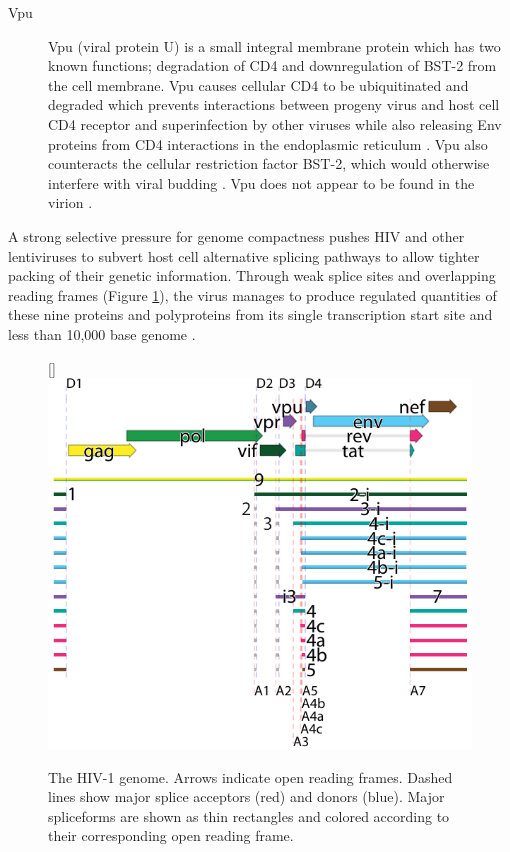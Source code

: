 \documentclass[../sherrill-Mix_thesis.tex]{subfiles}
\begin{document}
\begin{description}
		\item[Vpu]
			Vpu (viral protein U) \citep{Cohen1988,Strebel1988} is a small integral membrane protein which has two known functions; degradation of CD4 and downregulation of BST-2 from the cell membrane. Vpu causes cellular CD4 to be ubiquitinated and degraded \citep{Willey1992,Bour1995} which prevents interactions between progeny virus and host cell CD4 receptor \citep{Marshall1992,Lama1999,Ross1999,Cortes2002} and superinfection by other viruses \citep{Benson1993}  while also releasing Env proteins from CD4 interactions in the endoplasmic reticulum \citep{Crise1990,Bour1991}. Vpu also counteracts the cellular restriction factor BST-2, which would otherwise interfere with viral budding \citep{Neil2008,VanDamme2008}. Vpu does not appear to be found in the virion \citep{Strebel1989}.
	\end{description}

	A strong selective pressure for genome compactness \citep{Gelinas1986,Herman1987,Shin2000} pushes HIV and other lentiviruses to subvert host cell alternative splicing pathways to allow tighter packing of their genetic information. Through weak splice sites \citep{Kammler2006} and overlapping reading frames (Figure \ref{figHIVGenome}), the virus manages to produce regulated quantities of these nine proteins and polyproteins from its single transcription start site and less than 10,000 base genome \citep{Stoltzfus2009}.

	\begin{figure}
		\centering
		[\FBwidth]{
			\includegraphics[width=.7\textwidth]{exonProt2.pdf}
		}{
			\caption[The HIV-1 genome]{The HIV-1 genome. Arrows indicate open reading frames. Dashed lines show major splice acceptors (red) and donors (blue). Major spliceforms are shown as thin rectangles and colored according to their corresponding open reading frame.}
			\label{figHIVGenome}
		}
	\end{figure}
\end{document}
